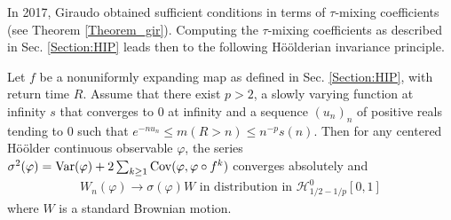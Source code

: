 \documentclass{ws-sd}
\begin{document}
In 2017, Giraudo \cite{12} obtained sufficient conditions in terms of $\tau$-mixing coefficients (see Theorem \ref{Theorem_gir}). Computing the $\tau$-mixing coefficients as described in Sec. \ref{Section:HIP} leads then to the following Hö\"olderian invariance principle.
\begin{theorem}\label{hip}
    Let $f$ be a nonuniformly expanding map as defined in Sec. \ref{Section:HIP}, with return time $R$. Assume that there exist $p>2$, a slowly varying function at infinity $s$ that converges to 0 at infinity and a sequence $(u_n)_n$ of positive reals tending to 0 such that $e^{-nu_n} \le m(R>n) \le n^{-p}s(n)$. Then for any centered H\"oölder continuous observable $\varphi$, the series $\sigma^2(\varphi) = {\rm Var}(\varphi) + 2\sum_{k \ge 1} {\rm Cov}(\varphi, \varphi \circ f^k)$ converges absolutely and
    \begin{align*}
        W_n(\varphi) \to \sigma(\varphi)W \text{ in distribution in } \mathcal H _{1/2-1/p}^0 [0,1]
    \end{align*}
    where $W$ is a standard Brownian motion.
\end{theorem}
~\\
\end{document}
